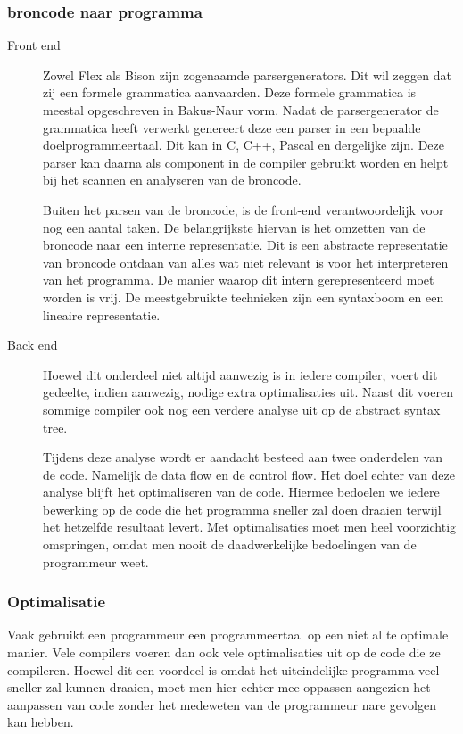 \documentclass[11pt,a4paper]{article}
\begin{document}
\subsubsection{broncode naar programma}

\begin{description}

\item[Front end]
Zowel Flex als Bison zijn zogenaamde parsergenerators. Dit wil zeggen dat zij een formele grammatica aanvaarden. Deze formele grammatica is meestal opgeschreven in Bakus-Naur vorm. Nadat de parsergenerator de grammatica heeft verwerkt genereert deze een parser in een bepaalde doelprogrammeertaal. Dit kan in C, C++, Pascal en dergelijke zijn. Deze parser kan daarna als component in de compiler gebruikt worden en helpt bij het scannen en analyseren van de broncode.

Buiten het parsen van de broncode, is de front-end verantwoordelijk voor nog een aantal taken. De belangrijkste hiervan is het omzetten van de broncode naar een interne representatie. Dit is een abstracte representatie van broncode ontdaan van alles wat niet relevant is voor het interpreteren van het programma. De manier waarop dit intern gerepresenteerd moet worden is vrij. De meestgebruikte technieken zijn een syntaxboom en een lineaire representatie. 

\item[Back end]
Hoewel dit onderdeel niet altijd aanwezig is in iedere compiler, voert dit gedeelte, indien aanwezig, nodige extra optimalisaties uit. Naast dit voeren sommige compiler ook nog een verdere analyse uit op de abstract syntax tree.

Tijdens deze analyse wordt er aandacht besteed aan twee onderdelen van de code. Namelijk de data flow en de control flow. Het doel echter van deze analyse blijft het optimaliseren van de code. Hiermee bedoelen we iedere bewerking op de code die het programma sneller zal doen draaien terwijl het hetzelfde resultaat levert. Met optimalisaties moet men heel voorzichtig omspringen, omdat men nooit de daadwerkelijke bedoelingen van de programmeur weet.

\end{description}

\subsubsection{Optimalisatie}

Vaak gebruikt een programmeur een programmeertaal op een niet al te optimale manier. Vele compilers voeren dan ook vele optimalisaties uit op de code die ze compileren. Hoewel dit een voordeel is omdat het uiteindelijke programma veel sneller zal kunnen draaien, moet men hier echter mee oppassen aangezien het aanpassen van code zonder het medeweten van de programmeur nare gevolgen kan hebben.
\end{document}

